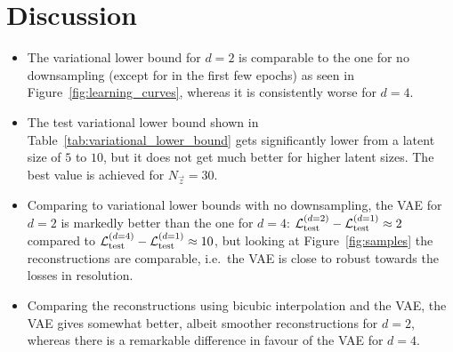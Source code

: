 \section{Discussion}
\label{sec:discussion}

\begin{itemize}
	\item The variational lower bound for $d = 2$ is comparable to the one for no downsampling (except for in the first few epochs) as seen in Figure~\ref{fig:learning_curves}, whereas it is consistently worse for $d = 4$.
	\item The test variational lower bound shown in Table~\ref{tab:variational_lower_bound} gets significantly lower from a latent size of $5$ to $10$, but it does not get much better for higher latent sizes. The best value is achieved for $N_{\vec{z}} = 30$.
	\item Comparing to variational lower bounds with no downsampling,
	the VAE for $d = 2$ is markedly better than the one for $d = 4$: $\mathcal{L}_{\text{test}}^{(d = 2)} - \mathcal{L}_{\text{test}}^{(d = 1)} \approx 2$ compared to $\mathcal{L}_{\text{test}}^{(d = 4)} - \mathcal{L}_{\text{test}}^{(d = 1)} \approx 10$, but looking at Figure~\ref{fig:samples} the reconstructions are comparable, i.e.\ the VAE is close to robust towards the losses in resolution.
	\item Comparing the reconstructions using bicubic interpolation and the VAE, the VAE gives somewhat better, albeit smoother reconstructions for $d = 2$, whereas there is a remarkable difference in favour of the VAE for $d = 4$.
\end{itemize}
